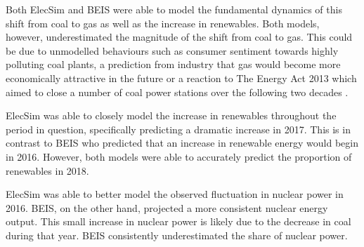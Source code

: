 Both ElecSim and BEIS were able to model the fundamental dynamics of this shift from coal to gas as well as the increase in renewables. Both models, however, underestimated the magnitude of the shift from coal to gas. This could be due to unmodelled behaviours such as consumer sentiment towards highly polluting coal plants, a prediction from industry that gas would become more economically attractive in the future or a reaction to The Energy Act 2013 which aimed to close a number of coal power stations over the following two decades \cite{uk_energy_act}.


ElecSim was able to closely model the increase in renewables throughout the period in question, specifically predicting a dramatic increase in 2017. This is in contrast to BEIS who predicted that an increase in renewable energy would begin in 2016. However, both models were able to accurately predict the proportion of renewables in 2018. 

ElecSim was able to better model the observed fluctuation in nuclear power in 2016. BEIS, on the other hand, projected a more consistent nuclear energy output. This small increase in nuclear power is likely due to the decrease in coal during that year. BEIS consistently underestimated the share of nuclear power. 









